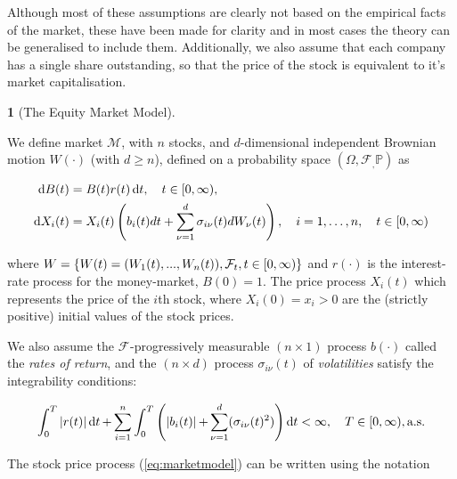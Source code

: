 \documentclass[british]{amsart} \usepackage{lmodern}
\numberwithin{equation}{section} \numberwithin{figure}{section}
\theoremstyle{plain} \newtheorem{thm}{\protect\theoremname}[section]
\theoremstyle{definition} \newtheorem{defn}[thm]{\protect\definitionname}
\theoremstyle{plain} \newtheorem{assumption}[thm]{\protect\assumptionname}
\theoremstyle{plain} \newtheorem{lem}[thm]{\protect\lemmaname}
\theoremstyle{plain} \newtheorem{prop}[thm]{\protect\propositionname}
\theoremstyle{remark} \newtheorem{rem}[thm]{\protect\remarkname}
\theoremstyle{plain} \newtheorem{cor}[thm]{\protect\corollaryname}
\renewcommand{\d}[1]{\mathop{\mathrm{d}{#1}}}
\newcommand{\filtration}[1]{\mathcal{F}_{#1}}
\newcommand{\abs}[1]{\mathop{|{#1}|}} \newcommand{\market}{\mathcal{M}}
\newcommand{\rangei}{i=1,\dots,n} \newcommand{\measure}{\mathbb{P}}
\newcommand{\probabilityspace}{(\Omega,\filtration,\measure)}
\begin{document}
Although most of these assumptions are clearly not based on the empirical facts
of the market, these have been made for clarity and in most cases the theory can
be generalised to include them. Additionally, we also assume that each company
has a single share outstanding, so that the price of the stock is equivalent to
it's market capitalisation.

\begin{defn} [The Equity Market Model]
  \label{def:marketmodel}

  We define market $\market$, with $n$ stocks, and $d$-dimensional independent
  Brownian motion $W(\cdot)$ (with $d \ge n$), defined on a probability space 
  $\probabilityspace$ as

  \begin{gather}
    \label{eq:marketmodel}
    \begin{split}
      \d{B(t)} &= B(t)r(t)\d{t},  
        \quad \ranget, \\
      \d{X_{i}(t)} &= 
            X_{i}(t) 
            \left(
                b_{i}(t)dt + \sum_{\nu=1}^{d} \sigma_{i\nu}(t) dW_{\nu}(t)
            \right),
        \quad \rangei,
        \quad \ranget
    \end{split}
  \end{gather}

  where $W = \left\{ W(t)=(W_{1}(t),...,W_{n}(t)),\filtration{t},\ranget \right\}$
  and $r(\cdot)$ is the interest-rate process for the money-market, $B(0)=1$. The
  price process $X_{i}(t)$ which represents the price of the $i$th stock, where
  $X_{i}(0) = x_{i} > 0$ are the (strictly positive) initial values of the stock
  prices.

  We also assume the $\filtration{}$-progressively measurable $(n \times 1)$
  process $b(\cdot)$ called the \textit{rates of return}, and the $(n \times d)$
  process $\sigma_{i\nu}(t)$ of \textit{volatilities} satisfy the integrability
  conditions: 

  \begin{equation*}
    \int_{0}^{T} 
    \abs{r(t)} 
    \d{t} +
    \sum_{i=1}^{n} \int_{0}^{T} 
      \left( 
          \abs{b_{i}(t)} +
          \sum_{\nu=1}^{d} ( \sigma_{i\nu}(t)^2  ) 
          \right) \d{t} < \infty,
    \quad
    T \in [0, \infty),
    \almostsurely
   \end{equation*}

\end{defn}

The stock price process (\ref{eq:marketmodel}) can be written using the notation 
\end{document}
